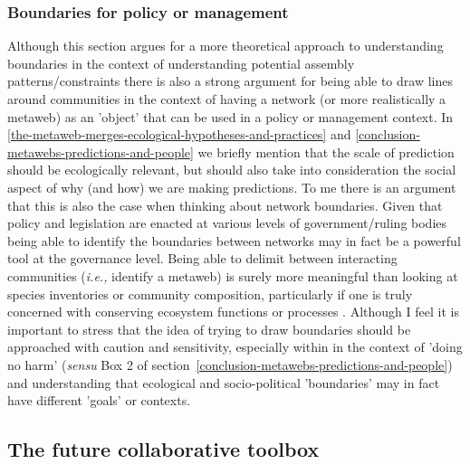 \subsubsection{Boundaries for policy or management}

Although this section argues for a more theoretical approach to understanding boundaries in the context of understanding potential assembly patterns/constraints there is also a strong argument for being able to draw lines around communities in the context of having a network (or more realistically a metaweb) as an 'object' that can be used in a policy or management context. In \autoref{the-metaweb-merges-ecological-hypotheses-and-practices} and \autoref{conclusion-metawebs-predictions-and-people} we briefly mention that the scale of prediction should be ecologically relevant, but should also take into consideration the social aspect of why (and how) we are making predictions. To me there is an argument that this is also the case when thinking about network boundaries. Given that policy and legislation are enacted at various levels of government/ruling bodies being able to identify the boundaries between networks may in fact be a powerful tool at the governance level. Being able to delimit between interacting communities (\emph{i.e.,} identify a metaweb) is surely more meaningful than looking at species inventories or community composition, particularly if one is truly concerned with conserving ecosystem functions or processes \cite{Wood2022Missing, ThuillerNavigating}. Although I feel it is important to stress that the idea of trying to draw boundaries should be approached with caution and sensitivity, especially within in the context of 'doing no harm' (\emph{sensu} Box 2 of section~\ref{conclusion-metawebs-predictions-and-people}) and understanding that ecological and socio-political 'boundaries' may in fact have different 'goals' or contexts.

\subsection{The future collaborative toolbox}

